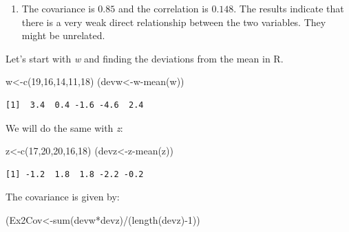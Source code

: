 \documentclass[
  letterpaper,
  DIV=11,
  numbers=noendperiod]{scrreprt}
\newenvironment{Shaded}{\begin{snugshade}}{\end{snugshade}}
\newcommand{\DecValTok}[1]{\textcolor[rgb]{0.68,0.00,0.00}{#1}}
\newcommand{\FunctionTok}[1]{\textcolor[rgb]{0.28,0.35,0.67}{#1}}
\newcommand{\NormalTok}[1]{\textcolor[rgb]{0.00,0.23,0.31}{#1}}
\newcommand{\OtherTok}[1]{\textcolor[rgb]{0.00,0.23,0.31}{#1}}
\newcommand{\SpecialCharTok}[1]{\textcolor[rgb]{0.37,0.37,0.37}{#1}}
\providecommand{\tightlist}{%
  \setlength{\itemsep}{0pt}\setlength{\parskip}{0pt}}\usepackage{longtable,booktabs,array}
\begin{document}
\begin{blackbox}

\begin{enumerate}
\def\labelenumi{\arabic{enumi}.}
\setcounter{enumi}{1}
\tightlist
\item
  The covariance is \(0.85\) and the correlation is \(0.148\). The
  results indicate that there is a very weak direct relationship between
  the two variables. They might be unrelated.
\end{enumerate}

\end{blackbox}

Let's start with \emph{w} and finding the deviations from the mean in R.

\begin{Shaded}
\begin{Highlighting}[numbers=left,,]
\NormalTok{w}\OtherTok{\textless{}{-}}\FunctionTok{c}\NormalTok{(}\DecValTok{19}\NormalTok{,}\DecValTok{16}\NormalTok{,}\DecValTok{14}\NormalTok{,}\DecValTok{11}\NormalTok{,}\DecValTok{18}\NormalTok{)}
\NormalTok{(devw}\OtherTok{\textless{}{-}}\NormalTok{w}\SpecialCharTok{{-}}\FunctionTok{mean}\NormalTok{(w))}
\end{Highlighting}
\end{Shaded}

\begin{verbatim}
[1]  3.4  0.4 -1.6 -4.6  2.4
\end{verbatim}

We will do the same with \emph{z}:

\begin{Shaded}
\begin{Highlighting}[numbers=left,,]
\NormalTok{z}\OtherTok{\textless{}{-}}\FunctionTok{c}\NormalTok{(}\DecValTok{17}\NormalTok{,}\DecValTok{20}\NormalTok{,}\DecValTok{20}\NormalTok{,}\DecValTok{16}\NormalTok{,}\DecValTok{18}\NormalTok{)}
\NormalTok{(devz}\OtherTok{\textless{}{-}}\NormalTok{z}\SpecialCharTok{{-}}\FunctionTok{mean}\NormalTok{(z))}
\end{Highlighting}
\end{Shaded}

\begin{verbatim}
[1] -1.2  1.8  1.8 -2.2 -0.2
\end{verbatim}

The covariance is given by:

\begin{Shaded}
\begin{Highlighting}[numbers=left,,]
\NormalTok{(Ex2Cov}\OtherTok{\textless{}{-}}\FunctionTok{sum}\NormalTok{(devw}\SpecialCharTok{*}\NormalTok{devz)}\SpecialCharTok{/}\NormalTok{(}\FunctionTok{length}\NormalTok{(devz)}\SpecialCharTok{{-}}\DecValTok{1}\NormalTok{))}
\end{Highlighting}
\end{Shaded}
\end{document}
